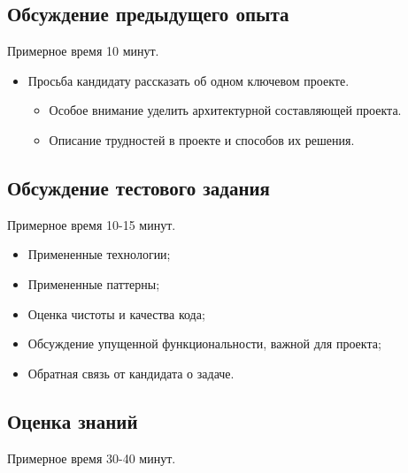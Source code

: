 \documentclass[a4paper,8pt]{article}
\begin{document}
\subsection*{Обсуждение предыдущего опыта}

Примерное время 10 минут.

\begin{itemize}
    \item Просьба кандидату рассказать об одном ключевом проекте. 
    \begin{itemize}
        \item Особое внимание уделить архитектурной составляющей проекта. 
        \item Описание трудностей в проекте и способов их решения.
    \end{itemize}
\end{itemize}

\subsection*{Обсуждение тестового задания}

Примерное время 10-15 минут.

\begin{itemize}
    \item Примененные технологии;
    \item Примененные паттерны;
    \item Оценка чистоты и качества кода;
    \item Обсуждение упущенной функциональности, важной для проекта;
    \item Обратная связь от кандидата о задаче.
\end{itemize}

\subsection*{Оценка знаний}

Примерное время 30-40 минут.
\end{document}
